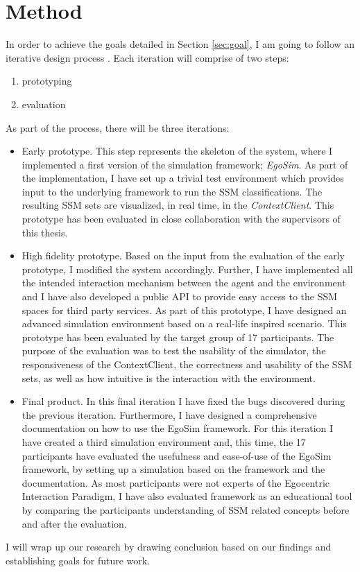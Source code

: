 \section{Method} %
\label{sec:method}

In order to achieve the goals detailed in Section \ref{sec:goal}, I am going to follow an iterative design process \cite{mackay1997hci}. Each iteration will comprise of two steps:
\begin{enumerate}
	\item prototyping
	\item evaluation
\end{enumerate}

As part of the process, there will be three iterations:
\begin{itemize}
	\item Early prototype. This step represents the skeleton of the system, where I implemented a first version of the simulation framework; \emph{EgoSim}. As part of the implementation, I have set up a trivial test environment which provides input to the underlying framework to run the SSM classifications. The resulting SSM sets are visualized, in real time, in the \emph{ContextClient}. This prototype has been evaluated in close collaboration with the supervisors of this thesis.
	\item High fidelity prototype. Based on the input from the evaluation of the early prototype, I modified the system accordingly. Further, I have implemented all the intended interaction mechanism between the agent and the environment and I have also developed a public API to provide easy access to the SSM spaces for third party services. As part of this prototype, I have designed an advanced simulation environment based on a real-life inspired scenario. This prototype has been evaluated by the target group of 17 participants. The purpose of the evaluation was to test the usability of the simulator, the responsiveness of the ContextClient, the correctness and usability of the SSM sets, as well as how intuitive is the interaction with the environment.
	\item Final product. In this final iteration I have fixed the bugs discovered during the previous iteration. Furthermore, I have designed a comprehensive documentation on how to use the EgoSim framework. For this iteration I have created a third simulation environment and, this time, the 17 participants have evaluated the usefulness and ease-of-use of the EgoSim framework, by setting up a simulation based on the framework and the documentation. As most participants were not experts of the Egocentric Interaction Paradigm, I have also evaluated framework as an educational tool by comparing the participants understanding of SSM related concepts before and after the evaluation.
\end{itemize}

I will wrap up our research by drawing conclusion based on our findings and establishing goals for future work.

